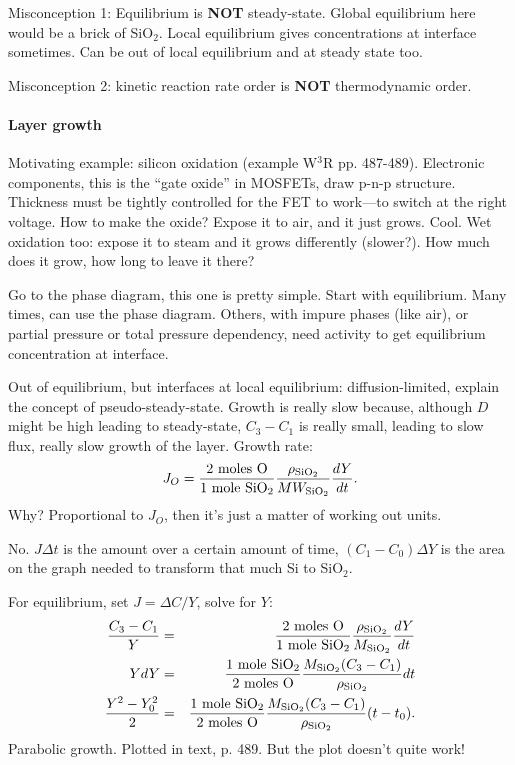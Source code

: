 \documentclass{report}
\begin{document}
\noindent Misconception 1: Equilibrium is {\bf NOT} steady-state.  Global
equilibrium here would be a brick of SiO$_2$.  Local equilibrium gives
concentrations at interface sometimes.  Can be out of local equilibrium and at
steady state too.

\noindent Misconception 2: kinetic reaction rate order is {\bf NOT}
thermodynamic order.

\paragraph{Layer growth}

Motivating example: silicon oxidation (example W$^3$R pp. 487-489).  Electronic
components, this is the ``gate oxide'' in MOSFETs, draw p-n-p structure.
Thickness must be tightly controlled for the FET to work---to switch at the
right voltage.  How to make the oxide?  Expose it to air, and it just grows.
Cool.  Wet oxidation too: expose it to steam and it grows differently
(slower?).  How much does it grow, how long to leave it there?

Go to the phase diagram, this one is pretty simple.  Start with equilibrium.
Many times, can use the phase diagram.  Others, with impure phases (like air),
or partial pressure or total pressure dependency, need activity to get
equilibrium concentration at interface.

Out of equilibrium, but interfaces at local equilibrium: diffusion-limited,
explain the concept of pseudo-steady-state.  Growth is really slow because,
although $D$ might be high leading to steady-state, $C_3-C_1$ is really small,
leading to slow flux, really slow growth of the layer.  Growth rate:
\begin{equation}
  \label{eq:fluxgrow}
  J_O = \frac{\rm 2\ moles\ O}{\rm 1\ mole\ SiO_2}
\frac{\rho_{\rm SiO_2}}{MW_{\rm SiO_2}} \frac{dY}{dt}.
\end{equation}
Why?  Proportional to $J_O$, then it's just a matter of working out units.

No.  $J\Delta t$ is the amount over a certain amount of time, $(C_1-C_0) \Delta
Y$ is the area on the graph needed to transform that much Si to SiO$_2$.

\noindent For equilibrium, set $J=\Delta C/Y$, solve for $Y$:
\begin{eqnarray}
  \label{eq:parabolicgrowth}
  \frac{C_3-C_1}{Y} &=& \frac{\rm 2\ moles\ O}{\rm 1\ mole\ SiO_2}
  \frac{\rho_{\rm SiO_2}}{M_{\rm SiO_2}} \frac{dY}{dt} \\
  Y dY &=& \frac{\rm 1\ mole\ SiO_2}{\rm 2\ moles\ O}
  \frac{M_{\rm SiO_2} (C_3-C_1)}{\rho_{\rm SiO_2}} dt \\
  \frac{Y^2-Y_0^2}{2} &=& \frac{\rm 1\ mole\ SiO_2}{\rm 2\ moles\ O}
  \frac{M_{\rm SiO_2} (C_3-C_1)}{\rho_{\rm SiO_2}} (t-t_0).
\end{eqnarray}
Parabolic growth.  Plotted in text, p. 489.  But the plot doesn't quite work!
\newpage
\end{document}
